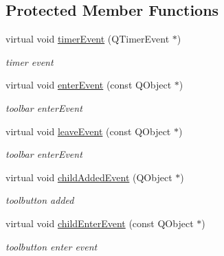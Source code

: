 \subsection*{Protected Member Functions}
\begin{DoxyCompactItemize}
\item 
\mbox{\label{class_tool_bar_data_a1a8dc26b5a887cda364e5619d1c05521}} 
virtual void \hyperlink{class_tool_bar_data_a1a8dc26b5a887cda364e5619d1c05521}{timer\+Event} (Q\+Timer\+Event $\ast$)
\begin{DoxyCompactList}\small\item\em timer event \end{DoxyCompactList}\item 
\mbox{\label{class_tool_bar_data_a628c1a2a8dec7ea4d774fdd0680ffa86}} 
virtual void \hyperlink{class_tool_bar_data_a628c1a2a8dec7ea4d774fdd0680ffa86}{enter\+Event} (const Q\+Object $\ast$)
\begin{DoxyCompactList}\small\item\em toolbar enter\+Event \end{DoxyCompactList}\item 
\mbox{\label{class_tool_bar_data_ad27c9aa6c04c032947e8d9e7b40847ec}} 
virtual void \hyperlink{class_tool_bar_data_ad27c9aa6c04c032947e8d9e7b40847ec}{leave\+Event} (const Q\+Object $\ast$)
\begin{DoxyCompactList}\small\item\em toolbar enter\+Event \end{DoxyCompactList}\item 
\mbox{\label{class_tool_bar_data_a460434b3474a14fbc8698e3061672e8f}} 
virtual void \hyperlink{class_tool_bar_data_a460434b3474a14fbc8698e3061672e8f}{child\+Added\+Event} (Q\+Object $\ast$)
\begin{DoxyCompactList}\small\item\em toolbutton added \end{DoxyCompactList}\item 
\mbox{\label{class_tool_bar_data_adaca9c64635fcc09d5a9e948269de146}} 
virtual void \hyperlink{class_tool_bar_data_adaca9c64635fcc09d5a9e948269de146}{child\+Enter\+Event} (const Q\+Object $\ast$)
\begin{DoxyCompactList}\small\item\em toolbutton enter event \end{DoxyCompactList}\end{DoxyCompactItemize}
